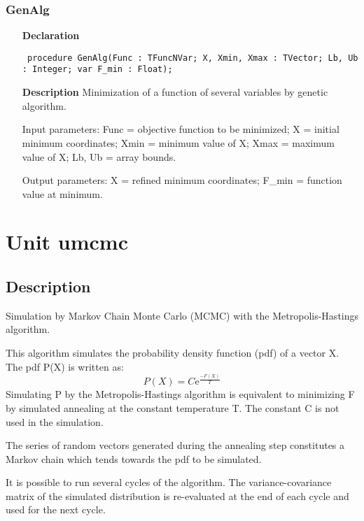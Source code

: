 \documentclass[12pt,a4paper,oneside]{report}
\newcommand{\euler}{\mathrm{e}}
\newcommand{\declarationitem}[1]{\textbf{#1}}
\newcommand{\descriptiontitle}[1]{\textbf{#1}}
\newcommand{\code}[1]{\texttt{#1}}
\begin{document}
\subsubsection{GenAlg}
\label{ugenalg-GenAlg}
\begin{itemize}\item[\declarationitem{Declaration}\hfill]
	\begin{flushleft}
		\code{
			procedure GenAlg(Func : TFuncNVar; X, Xmin, Xmax : TVector; Lb, Ub : Integer; var F{\_}min : Float);}
		
	\end{flushleft}
	
	\par
	\item[\descriptiontitle{Description}]
	Minimization of a function of several variables by genetic algorithm.
	
	Input parameters: Func = objective function to be minimized; X = initial minimum coordinates; Xmin = minimum value of X; Xmax = maximum value of X; Lb, Ub = array bounds.
	
	Output parameters: X = refined minimum coordinates; F{\_}min = function value at minimum.
	
\end{itemize}

\section{Unit umcmc}
\label{umcmc}
\subsection{Description}
Simulation by Markov Chain Monte Carlo (MCMC) with the Metropolis{-}Hastings algorithm.

This algorithm simulates the probability density function (pdf) of a vector X. The pdf P(X) is written as:
$$
P(X) = C \euler^{\frac{-F(X)}{T}}
$$
Simulating P by the Metropolis-Hastings algorithm is equivalent to minimizing F by simulated annealing at the constant temperature T. The constant C is not used in the simulation.

The series of random vectors generated during the annealing step constitutes a Markov chain which tends towards the pdf to be simulated.

It is possible to run several cycles of the algorithm. The variance{-}covariance matrix of the simulated distribution is re{-}evaluated at the end of each cycle and used for the next cycle.
\end{document}
